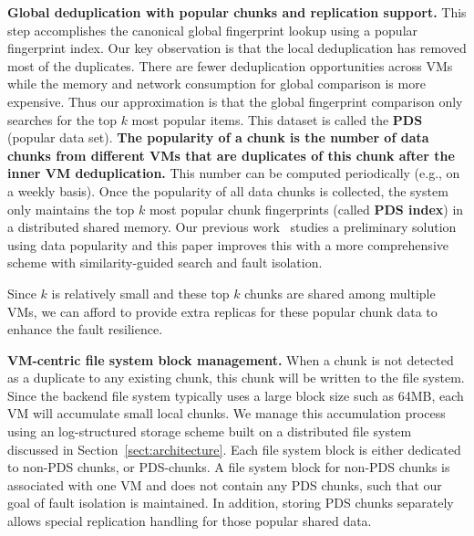 \textbf{Global deduplication with popular chunks and replication support.}
This step accomplishes the canonical global fingerprint lookup using a popular fingerprint index.
Our key observation is that the local deduplication has removed most of the duplicates.
There are fewer deduplication opportunities across VMs while the memory and network
consumption for global comparison is more expensive.
Thus our approximation is that the global fingerprint comparison only searches for the top $k$
most popular items. This dataset is called the \textbf{PDS} (popular data set). 
\textbf{The popularity of a chunk is the number  of data chunks  from different VMs
that are duplicates of this chunk after the inner VM deduplication.}
This number can be computed periodically (e.g., on a weekly basis).
Once the popularity of all data chunks is collected, the system only maintains the top $k$
most popular chunk fingerprints (called \textbf{PDS index}) in a distributed shared memory.  
Our previous work~\cite{WeiZhangIEEE} studies a preliminary solution using data popularity and this
paper improves this with a more comprehensive scheme with  similarity-guided search and fault isolation.

Since $k$ is relatively small and these top $k$ chunks are shared among multiple VMs, 
we can afford to provide extra replicas for these popular chunk data to enhance the fault resilience.

\textbf{VM-centric file system block management.}
When a chunk is not detected as a duplicate to any existing chunk, this chunk will be written
to the file system. Since the backend file system typically uses a large block size such as 64MB, each VM will 
accumulate small local chunks. We manage this accumulation process using an log-structured storage scheme built
on a distributed file system discussed in Section~\ref{sect:architecture}.
Each file system block is either dedicated to non-PDS chunks, or PDS-chunks.
A file system block for non-PDS chunks is associated with one VM and does not contain
any PDS chunks, such that our goal of fault isolation is maintained.
In addition, storing PDS chunks separately allows special replication handling for those popular shared data. 



